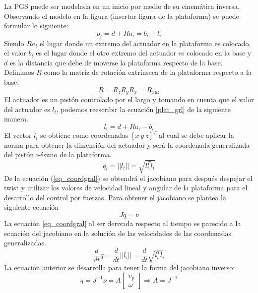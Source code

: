 La PGS puede ser modelada en un inicio por medio de su cinemática inversa. Observando el modelo en la figura (insertar figura de la plataforma) se puede formular lo siguiente:
\begin{equation} \label{plat_grl}
p_i = d + Ra_i = b_i + l_i
\end{equation}
Siendo $Ra_i$ el lugar donde un extremo del actuador en la plataforma es colocado, el valor $b_i$ es el lugar donde el otro extremo del actuador es colocado en la base y $d$ es la distancia que debe de moverse la plataforma respecto de la base. Definimos $R$ como la matriz de rotación extrínseca de la plataforma respecto a la base. 
\begin{equation}
R = R_zR_yR_x = R_{xyz}
\end{equation}
El actuador es un pistón controlado por el largo y tomando en cuenta que el valor del actuador es $l_i$, podemos reescribir la ecuación \ref{plat_grl} de la siguiente manera.
\begin{equation}
l_i = d + Ra_i - b_i
\end{equation}
El vector $l_i$ se obtiene como coordenadas $[x\ y\ z]^T$ al cual se debe aplicar la norma para obtener la dimensión del actuador y será la coordenada generalizada del pistón i-ésimo de la plataforma.
\begin{equation}\label{eq_coordgral}
q_i = ||l_i|| = \sqrt{l_i^Tl_i}
\end{equation}
De la ecuación (\ref{eq_coordgral}) se obtendrá el jacobiano para después despejar el twist y utilizar los valores de velocidad lineal y angular de la plataforma para el desarrollo del control por fuerzas. Para obtener el jacobiano se plantea la siguiente ecuación
\begin{equation} \label{equgral_q}
J\dot{q}=\nu
\end{equation}
La ecuación \ref{eq_coordgral} al ser derivada respecto al tiempo es parecido a la ecuación del jacobiano en la solución de las velocidades de las coordenadas generalizadas.
\begin{equation}
\frac{d}{dt}q = \frac{d}{dt}||l_i|| = \frac{d}{dt}\sqrt{l_i^Tl_i} 
\end{equation}
La ecuación anterior se desarrolla para tener la forma del jacobiano inverso:
\begin{equation}
\dot{q}=J^{-1} \nu = A \begin{bmatrix}
v_p\\
\omega
\end{bmatrix} \Rightarrow A = J^{-1}
\end{equation}

